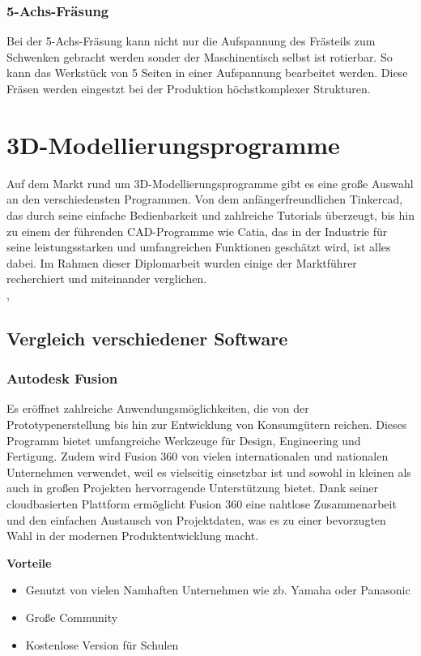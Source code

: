 \subsubsection{5-Achs-Fräsung}
Bei der 5-Achs-Fräsung kann nicht nur die Aufspannung des Frästeils zum Schwenken gebracht werden sonder der Maschinentisch selbst ist rotierbar. So kann das Werkstück von 5 Seiten in einer Aufspannung bearbeitet werden. Diese Fräsen werden eingestzt bei der Produktion höchstkomplexer Strukturen.\\
\cite{Fräsen-3/4/5-Achs}


\section{3D-Modellierungsprogramme}
Auf dem Markt rund um 3D-Modellierungsprogramme gibt es eine große Auswahl an den verschiedensten Programmen. Von dem anfängerfreundlichen Tinkercad, das durch seine einfache Bedienbarkeit und zahlreiche Tutorials überzeugt, bis hin zu einem der führenden CAD-Programme wie Catia, das in der Industrie für seine leistungsstarken und umfangreichen Funktionen geschätzt wird, ist alles dabei. Im Rahmen dieser Diplomarbeit wurden einige der Marktführer recherchiert und miteinander verglichen. \\
\cite{CAD-Programme}, \cite{3D-Printing-Software}

\subsection{Vergleich verschiedener Software}

\subsubsection{Autodesk Fusion}
Es eröffnet zahlreiche Anwendungsmöglichkeiten, die von der Prototypenerstellung bis hin zur Entwicklung von Konsumgütern reichen. Dieses Programm bietet umfangreiche Werkzeuge für Design, Engineering und Fertigung. Zudem wird Fusion 360 von vielen internationalen und nationalen Unternehmen verwendet, weil es vielseitig einsetzbar ist und sowohl in kleinen als auch in großen Projekten hervorragende Unterstützung bietet. Dank seiner cloudbasierten Plattform ermöglicht Fusion 360 eine nahtlose Zusammenarbeit und den einfachen Austausch von Projektdaten, was es zu einer bevorzugten Wahl in der modernen Produktentwicklung macht. \\
\cite{AutodeskFusion}

\textbf{Vorteile}
\begin{itemize}
	\item Genutzt von vielen Namhaften Unternehmen wie zb. Yamaha oder Panasonic
	\item Große Community
	\item Kostenlose Version für Schulen
\end{itemize} 

